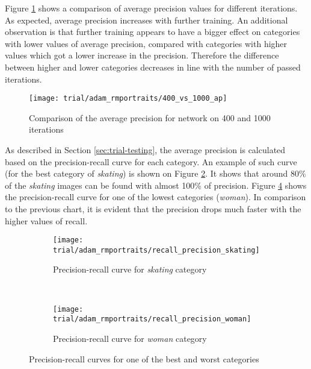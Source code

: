     Figure \ref{fig:trial-400-vs-1000} shows a comparison of average precision values for different iterations. As expected, average precision increases with further training. An additional observation is that further training appears to have a bigger effect on categories with lower values of average precision, compared with categories with higher values which got a lower increase in the precision. Therefore the difference between higher and lower categories decreases in line with the number of passed iterations.
    
    \begin{figure}[H]
        \centering
        \texttt{[image: trial/adam\_rmportraits/400\_vs\_1000\_ap]}
        \caption[Trial experiment. Comparison of the average precision for network on 400 and 1000 iterations]{Comparison of the average precision for network on 400 and 1000 iterations}
        \label{fig:trial-400-vs-1000}
    \end{figure}
    
    As described in Section \ref{sec:trial-testing}, the average precision is calculated based on the precision-recall curve for each category. An example of such curve (for the best category of \textit{skating}) is shown on Figure \ref{fig:trial-precision-recall-skating}. It shows that around 80\% of the \textit{skating} images can be found with almost 100\% of precision. Figure \ref{fig:trial-precision-recall-woman} shows the precision-recall curve for one of the lowest categories (\textit{woman}). In comparison to the previous chart, it is evident that the precision drops much faster with the higher values of recall.
    
    \begin{figure}[H]
    \centering
    \begin{subfigure}[a]{0.9\textwidth}
        \texttt{[image: trial/adam\_rmportraits/recall\_precision\_skating]}
        \caption[Trial experiment. Precision-recall curve for \textit{skating} category]{Precision-recall curve for \textit{skating} category}
        \label{fig:trial-precision-recall-skating}
    \end{subfigure}
    \\
    \begin{subfigure}[a]{0.9\textwidth}
        \texttt{[image: trial/adam\_rmportraits/recall\_precision\_woman]}
        \caption{Precision-recall curve for \textit{woman} category}
        \label{fig:trial-precision-recall-woman}
    \end{subfigure}
    \caption[Trial experiment. Precision-recall curves for one of the best and worst categories]{Precision-recall curves for one of the best and worst categories}
    \end{figure}
    


